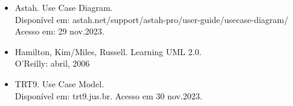 \documentclass[12pt, a4paper]{article}
\begin{document}
\begin{itemize}
   
   \item Astah. Use Case Diagram. \\
Disponível em: astah.net/support/astah-pro/user-guide/usecase-diagram/\\
Acesso em: 29 nov.2023.

   \item Hamilton, Kim/Miles, Russell. Learning UML 2.0.\\ 
O'Reilly: abril, 2006

   \item TRT9. Use Case Model.\\ 
Disponível em: trt9.jus.br. Acesso em 30 nov.2023.

\end{itemize}
\end{document}
